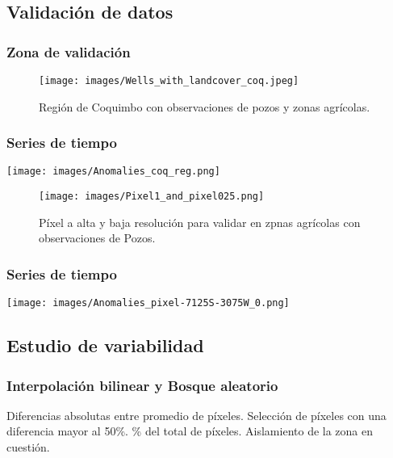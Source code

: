 \documentclass{beamer}
\begin{document}
  \subsection*{Validación de datos}

  \begin{frame}
    \frametitle{Zona de validación}
    \begin{figure}
      \centering
      \texttt{[image: images/Wells\_with\_landcover\_coq.jpeg]}
      \caption{Región de Coquimbo con observaciones de pozos y zonas agrícolas.}
    \end{figure}

  \end{frame}

  \begin{frame}
    \frametitle{Series de tiempo}
    
    \centering
    \texttt{[image: images/Anomalies\_coq\_reg.png]}
  
  \end{frame}

  \begin{frame}
    \begin{figure}
      \centering
      \texttt{[image: images/Pixel1\_and\_pixel025.png]}
      \caption{Píxel a alta y baja resolución para validar en zpnas agrícolas con observaciones de Pozos.}
    \end{figure}
  \end{frame}

  \begin{frame}
    \frametitle{Series de tiempo}
    
    \centering
    \texttt{[image: images/Anomalies\_pixel-7125S-3075W\_0.png]}
  \end{frame}



  \subsection*{Estudio de variabilidad}

  \begin{frame}
    \frametitle{Interpolación bilinear y Bosque aleatorio}

    \begin{outline}
      \1 Diferencias absolutas entre promedio de píxeles.
        \2 Selección de píxeles con una diferencia mayor al 50\%.
          \% del total de píxeles.
      \1 Aislamiento de la zona en cuestión.
    \end{outline}
  \end{frame}
\end{document}
